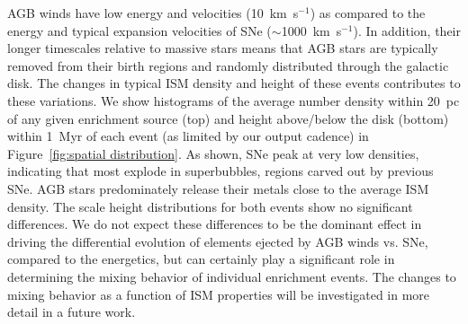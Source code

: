 AGB winds have low energy and velocities (10~km~s$^{-1}$) as compared to the energy and typical expansion velocities of SNe ($\sim$1000~km~s$^{-1}$). In addition, their longer timescales relative to massive stars means that AGB stars are typically removed from their birth regions and randomly distributed through the galactic disk. The changes in typical ISM density and height of these events contributes to these variations. We show histograms of the average number density within 20~pc of any given enrichment source (top) and height above/below the disk (bottom) within 1~Myr of each event (as limited by our output cadence) in Figure~\ref{fig:spatial distribution}. As shown, SNe peak at very low densities, indicating that most explode in superbubbles, regions carved out by previous SNe. AGB stars predominately release their metals close to the average ISM density. The scale height distributions for both events show no significant differences. We do not expect these differences to be the dominant effect in driving the differential evolution of elements ejected by AGB winds vs. SNe, compared to the energetics, but can certainly play a significant role in determining the mixing behavior of individual enrichment events. The changes to mixing behavior as a function of ISM properties will be investigated in more detail in a future work.

